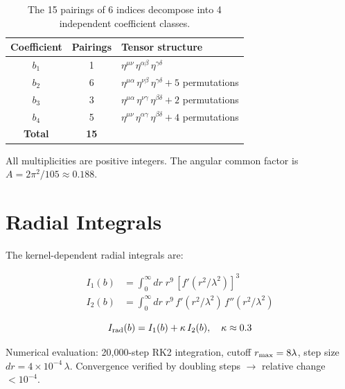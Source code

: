 \documentclass[aps,prd,onecolumn,superscriptaddress]{revtex4-2}
\begin{document}
\begin{table}[h]
\centering
\begin{tabular}{c|c|l}
Coefficient & Pairings & Tensor structure \\
\midrule
$b_1$ & 1 & $\eta^{\mu\nu}\,\eta^{\alpha\beta}\,\eta^{\gamma\delta}$ \\
$b_2$ & 6 & $\eta^{\mu\alpha}\,\eta^{\nu\beta}\,\eta^{\gamma\delta} + 5$ permutations \\
$b_3$ & 3 & $\eta^{\mu\alpha}\,\eta^{\nu\gamma}\,\eta^{\beta\delta} + 2$ permutations \\
$b_4$ & 5 & $\eta^{\mu\nu}\,\eta^{\alpha\gamma}\,\eta^{\beta\delta} + 4$ permutations \\
\midrule
\textbf{Total} & \textbf{15} & \\
\end{tabular}
\caption{The 15 pairings of 6 indices decompose into 4 independent coefficient classes.}
\label{tab:pairings}
\end{table}

All multiplicities are positive integers. The angular common factor is $A = 2\pi^2/105 \approx 0.188$.

\section{Radial Integrals}
\label{sec:S3}

The kernel-dependent radial integrals are:

\begin{align}
I_1(b) &= \int_0^\infty dr\; r^9\,[f'(r^2/\lambda^2)]^3 \label{eq:I1} \\
I_2(b) &= \int_0^\infty dr\; r^9\,f'(r^2/\lambda^2)\,f''(r^2/\lambda^2) \label{eq:I2}
\end{align}

\begin{equation}
I_{\rm rad}(b) = I_1(b) + \kappa\,I_2(b),\quad \kappa \approx 0.3
\label{eq:Irad}
\end{equation}

Numerical evaluation: 20,000-step RK2 integration, cutoff $r_{\rm max} = 8\lambda$, step size $dr = 4\times 10^{-4}\,\lambda$. Convergence verified by doubling steps $\to$ relative change $< 10^{-4}$.
\end{document}
